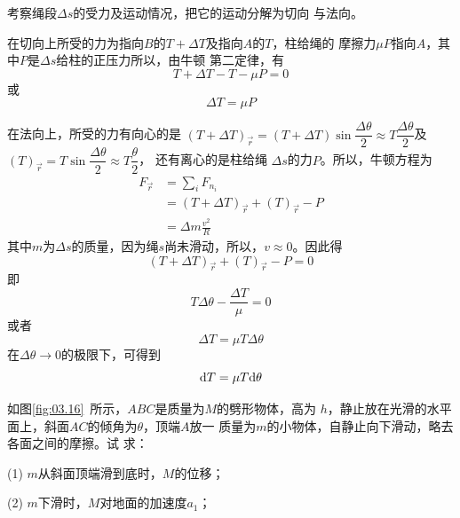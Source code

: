 \solution 考察绳段$ \Delta s $的受力及运动情况，把它的运动分解为切向
与法向。

在切向上所受的力为指向$ B $的$ T+\Delta T $及指向$ A $的$ T $，柱给绳的
摩擦力$ \mu P $指向$ A $，其中$ P $是$ \Delta s $给柱的正压力所以，由牛顿
第二定律，有
\begin{equation*}
    T + \Delta T - T - \mu P = 0
\end{equation*}
或\vspace{-1.56em}
\begin{equation*}
    \Delta T = \mu P
\end{equation*}

在法向上，所受的力有向心的是
$( T + \Delta T ) _ \vec{r} = ( T + \Delta T ) \sin \dfrac{ \Delta \theta }{ 2 } \approx T \dfrac { \Delta \theta }{2}$及$ (T)_\vec{r} = T \sin \dfrac { \Delta \theta } { 2 } \approx T \dfrac { \theta } { 2 }$，
还有离心的是柱给绳
$ \Delta s $的力$ P $。所以，牛顿方程为
\begin{align*}
    F _ { \vec{r} } &= \sum _ i  F _ { n _ { i } } \\
    &= ( T + \Delta T )_\vec{r} + ( T )_\vec{r} - P \\
    &= \Delta m \frac { v ^ { 2 } } { R }
\end{align*}
其中$ m $为$ \Delta s $的质量，因为绳$ s $尚未滑动，所以，$  v \approx 0 $。因此得
\begin{equation*}
    ( T + \Delta T ) _\vec{ r } + ( T ) _\vec{ r } - P = 0
\end{equation*}
即\vspace{-1.56em}
\begin{equation*}
    T \Delta \theta - \frac { \Delta T } { \mu } = 0
\end{equation*}
或者\vspace{-1.56em}
\begin{equation*}
    \Delta T = \mu T \Delta \theta
\end{equation*}
在$ \Delta \theta \rightarrow 0 $的极限下，可得到
\begin{equation*}
    {\mathrm d} T = \mu T {\mathrm d} \theta
\end{equation*}

\example 如图\ref{fig:03.16}~所示，$ ABC $是质量为$ M $的劈形物体，高为
$ h $，静止放在光滑的水平面上，斜面$ AC $的倾角为$\theta $，顶端$ A $放一
质量为$ m $的小物体，自静止向下滑动，略去各面之间的摩擦。试
求：

(1) $ m $从斜面顶端滑到底时，$ M $的位移；

(2) $ m $下滑时，$ M $对地面的加速度$ a_1 $；

